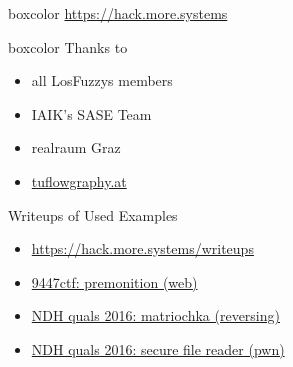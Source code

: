 {
\begin{frame}[plain]

  \begin{center}
  	\begin{beamercolorbox}[sep=0.5em,wd=10cm]{boxcolor}
	    \color{white}
	    {\huge \url{https://hack.more.systems}}
	\end{beamercolorbox}
  \end{center}

  \vspace{3em}


  \begin{beamercolorbox}[sep=1em,wd=5cm]{boxcolor}
    Thanks to

    \begin{itemize}
      \item all LosFuzzys members
      \item IAIK's SASE Team
      \item realraum Graz
      \item \url{tuflowgraphy.at}
    \end{itemize}
  \end{beamercolorbox}

\end{frame}
}

\begin{frame}
  {Writeups of Used Examples}

  \begin{itemize}
    \item \url{https://hack.more.systems/writeups}
  \end{itemize}

  \begin{itemize}
    \item
      \href{http://losfuzzys.github.io/writeup/2015/12/07/9447ctf-premonition/}
      {9447ctf: premonition (web)}
    \item \href{https://losfuzzys.github.io/writeup/2016/04/04/ndhquals2016-matriochka/}
      {NDH quals 2016: matriochka (reversing)}
    \item \href{https://losfuzzys.github.io/writeup/2016/04/04/ndhquals2016-secure-file-reader/}
      {NDH quals 2016: secure file reader (pwn)}
  \end{itemize}

\end{frame}

